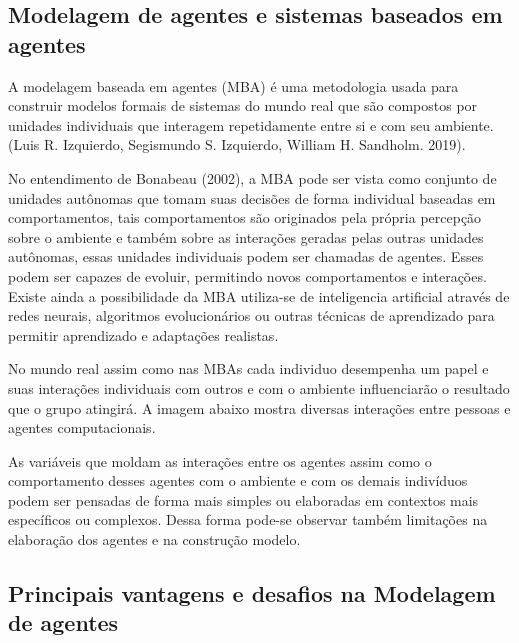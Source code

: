 \subsection{Modelagem de agentes e sistemas baseados em agentes}

A modelagem baseada em agentes (MBA) é uma metodologia usada para construir modelos formais de sistemas do mundo real que são compostos por unidades individuais que interagem repetidamente entre si e com seu ambiente.(Luis R. Izquierdo, Segismundo S. Izquierdo, William H. Sandholm. 2019)\cite{izquierdo2019introduction}. 

No entendimento de Bonabeau (2002), a MBA pode ser vista como conjunto de unidades autônomas que tomam suas decisões de forma individual baseadas em comportamentos, tais comportamentos são originados pela própria percepção sobre o ambiente e também sobre as interações geradas pelas outras unidades autônomas, essas unidades individuais podem ser chamadas de agentes. Esses podem ser capazes de evoluir, permitindo novos comportamentos e interações. Existe ainda a possibilidade da MBA utiliza-se de inteligencia artificial através de redes neurais, algoritmos evolucionários ou outras técnicas de aprendizado para permitir aprendizado e adaptações realistas\cite{bonabeau2002agent}. 

No mundo real assim como nas MBAs cada individuo desempenha um papel e suas interações individuais com outros e com o ambiente influenciarão o resultado que o grupo atingirá. A imagem abaixo mostra diversas interações entre pessoas e agentes computacionais.  




As variáveis que moldam as interações entre os agentes assim como o comportamento desses agentes com o ambiente e com os demais indivíduos podem ser pensadas de forma mais simples ou elaboradas em contextos mais específicos ou complexos. Dessa forma pode-se observar também limitações na elaboração dos agentes e na construção modelo.

\subsection{Principais vantagens e desafios na Modelagem de agentes}

